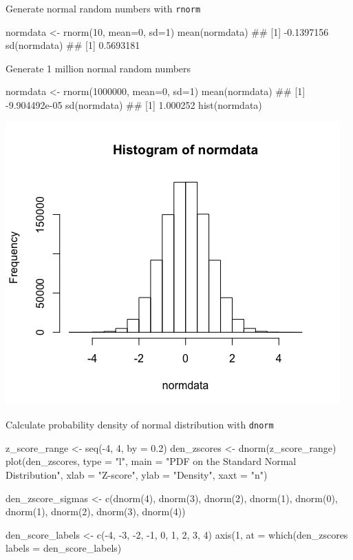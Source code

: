 \documentclass[12pt, t, xcolor=dvipsnames]{beamer}
\newcommand{\code}[1]{\colorbox{codegray}{\textcolor{black!95}{\texttt{#1}}}}
\begin{document}
\begin{frame}[fragile]{Generate normal random numbers with \code{rnorm}}
\begin{Rcode}
normdata <- rnorm(10, mean=0, sd=1) 
mean(normdata)
## [1] -0.1397156
sd(normdata)
## [1] 0.5693181
\end{Rcode}
\end{frame}

\begin{frame}[fragile]{Generate 1 million normal random numbers}
\begin{Rcode}
normdata <- rnorm(1000000, mean=0, sd=1) 
mean(normdata)
## [1] -9.904492e-05
sd(normdata)
## [1] 1.000252
hist(normdata)
\end{Rcode}
\includegraphics[height=0.5\textheight, keepaspectratio]{rnorm1m}
\end{frame}


\begin{frame}[fragile]{Calculate probability density of normal distribution with \code{dnorm}}
\begin{Rcode}
z_score_range <- seq(-4, 4, by = 0.2)
den_zscores <- dnorm(z_score_range)
plot(den_zscores, type = "l", 
     main = "PDF on the Standard Normal Distribution", 
     xlab = "Z-score", ylab = "Density", xaxt = "n")

den_zscore_sigmas <- c(dnorm(4), dnorm(3), dnorm(2), 
                       dnorm(1), dnorm(0), dnorm(1), 
                       dnorm(2), dnorm(3), dnorm(4))

den_score_labels <- c(-4, -3, -2, -1, 0, 1, 2, 3, 4)
axis(1, at = which(den_zscores %
     labels = den_score_labels)
\end{Rcode}
\end{frame}
\end{document}
